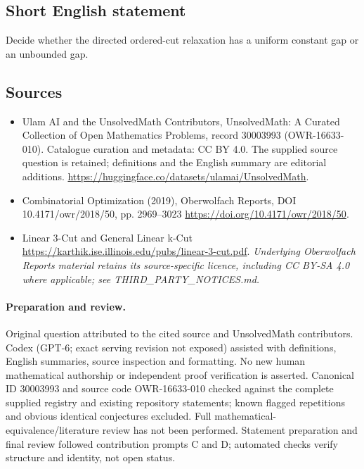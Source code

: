 \documentclass[11pt]{article}
\begin{document}
\subsection{Short English statement}
Decide whether the directed ordered-cut relaxation has a uniform constant gap or an unbounded gap.
\subsection{Sources}
\begin{itemize}
\item[\hypertarget{source:30003993:1}{S1}] Ulam AI and the UnsolvedMath Contributors, UnsolvedMath: A Curated Collection of Open Mathematics Problems, record 30003993 (OWR-16633-010). Catalogue curation and metadata: CC BY 4.0. The supplied source question is retained; definitions and the English summary are editorial additions.
\url{https://huggingface.co/datasets/ulamai/UnsolvedMath}.
\item[\hypertarget{source:30003993:2}{S2}] Combinatorial Optimization (2019), Oberwolfach Reports, DOI 10.4171/owr/2018/50, pp. 2969--3023
\url{https://doi.org/10.4171/owr/2018/50}.
\item[\hypertarget{source:30003993:3}{S3}] Linear 3-Cut and General Linear k-Cut
\url{https://karthik.ise.illinois.edu/pubs/linear-3-cut.pdf}.
\textit{Underlying Oberwolfach Reports material retains its source-specific licence, including CC BY-SA 4.0 where applicable; see THIRD\_PARTY\_NOTICES.md.}
\end{itemize}
\paragraph{Preparation and review.}
Original question attributed to the cited source and UnsolvedMath contributors. Codex (GPT-6; exact serving revision not exposed) assisted with definitions, English summaries, source inspection and formatting. No new human mathematical authorship or independent proof verification is asserted. Canonical ID 30003993 and source code OWR-16633-010 checked against the complete supplied registry and existing repository statements; known flagged repetitions and obvious identical conjectures excluded. Full mathematical-equivalence/literature review has not been performed. Statement preparation and final review followed contribution prompts C and D; automated checks verify structure and identity, not open status.
\label{end:30003993}
\end{document}
